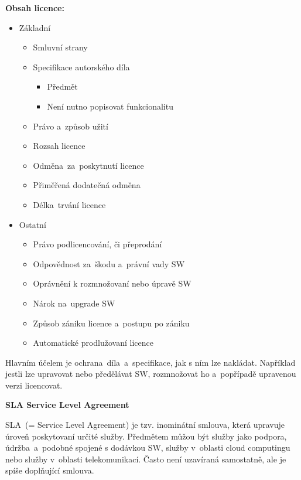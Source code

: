 \noindent\textbf{Obsah licence:}
\begin{itemize}[noitemsep]
    \item Základní
    \begin{itemize}[noitemsep]
        \item Smluvní strany
        \item Specifikace autorského díla
        \begin{itemize}[noitemsep]
            \item Předmět
            \item Není nutno popisovat funkcionalitu
        \end{itemize}
        \item Právo a~způsob užití
        \item Rozsah licence
        \item Odměna~za~poskytnutí licence
        \item Přiměřená dodatečná odměna
        \item Délka~trvání licence
    \end{itemize}
    \item Ostatní
    \begin{itemize}[noitemsep]
        \item Právo podlicencování, či přeprodání
        \item Odpovědnost za~škodu a~právní vady SW
        \item Oprávnění k rozmnožovaní nebo úpravě SW
        \item Nárok na~upgrade SW
        \item Způsob zániku licence a~postupu po zániku
        \item Automatické prodlužovaní licence
    \end{itemize}
\end{itemize}

Hlavním účelem je ochrana~díla~a~specifikace, jak s ním lze nakládat. Například jestli lze upravovat nebo předělávat SW, rozmnožovat ho a~popřípadě upravenou verzi licencovat. 
\clearpage


\begin{Large}
\textbf{SLA Service Level Agreement}
\end{Large}


SLA~(= Service Level Agreement) je tzv. inominátní smlouva, která upravuje úroveň poskytovaní určité služby. Předmětem můžou být služby jako podpora, údržba~a~podobné spojené s dodávkou SW, služby v~oblasti cloud computingu nebo služby v~oblasti telekomunikací. Často není uzavíraná samostatně, ale je spíše doplňující smlouva.
\newline


